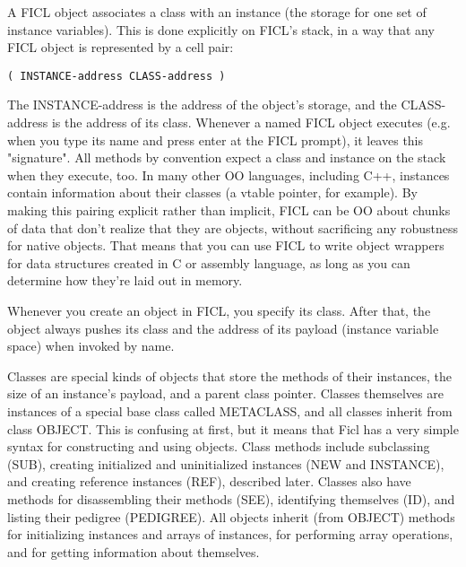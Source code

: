 A FICL object associates a class with an instance (the storage for one
set of instance variables). This is done explicitly on FICL's stack, in
a way that any FICL object is represented by a cell pair:
\begin{lstlisting}[frame=single]
( INSTANCE-address CLASS-address )
\end{lstlisting}
The INSTANCE-address is the address of the object's storage, and the
CLASS-address is the address of its class. Whenever a named FICL object
executes (e.g. when you type its name and press enter at the FICL
prompt), it leaves this "signature". All methods by convention expect a
class and instance on the stack when they execute, too. In many other
OO languages, including C++, instances contain information about their
classes (a vtable pointer, for example). By making this pairing
explicit rather than implicit, FICL can be OO about chunks of data that
don't realize that they are objects, without sacrificing any robustness
for native objects. That means that you can use FICL to write object
wrappers for data structures created in C or assembly language, as long
as you can determine how they're laid out in memory.

Whenever you create an object in FICL, you specify its class. After
that, the object always pushes its class and the address of its payload
(instance variable space) when invoked by name.

Classes are special kinds of objects that store the methods of their
instances, the size of an instance's payload, and a parent class pointer.
Classes themselves are instances of a special base class called
METACLASS, and all classes inherit from class OBJECT. This is confusing
at first, but it means that Ficl has a very simple syntax for
constructing and using objects. Class methods include subclassing (SUB),
creating initialized and uninitialized instances (NEW and INSTANCE), and
creating reference instances (REF), described later. Classes also have
methods for disassembling their methods (SEE), identifying themselves
(ID), and listing their pedigree (PEDIGREE). All objects inherit (from
OBJECT) methods for initializing instances and arrays of instances, for
performing array operations, and for getting information about
themselves.


